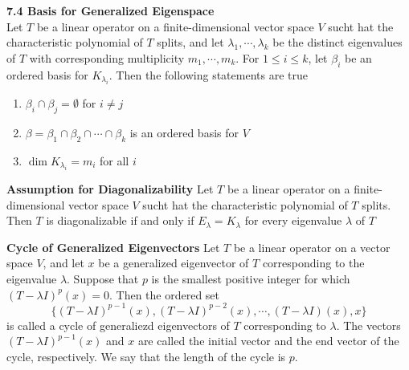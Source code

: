 \documentclass[11pt]{article}
\begin{document}
\begin{theorem*}
    \textbf{7.4 Basis for Generalized Eigenspace} \\
    Let $T$ be a linear operator on a finite-dimensional vector space $V$ sucht hat the characteristic polynomial of $T$ splits, and let $\lambda_1, \cdots, \lambda_k$ be the distinct eigenvalues of $T$ with corresponding multiplicity $m_1,\cdots, m_k$. For $1\leq i \leq k$, let $\beta_i$ be an ordered basis for $K_{\lambda_i}$. Then the following statements are true 
    \begin{enumerate}
        \item $\beta_i \cap \beta_j = \emptyset$ for $i\neq j$ 
        \item $\beta = \beta_1 \cap \beta_2 \cap \cdots \cap \beta_k$ is an ordered basis for $V$
        \item $\dim{K_{\lambda_i}} = m_i$ for all $i$
    \end{enumerate} 
\end{theorem*}

\begin{corollary*}
    \textbf{Assumption for Diagonalizability} Let $T$ be a linear operator on a finite-dimensional vector space $V$ sucht hat the characteristic polynomial of $T$ splits. Then $T$ is diagonalizable if and only if $E_{\lambda} = K_{\lambda}$ for every eigenvalue $\lambda$ of $T$
\end{corollary*}

\begin{defn*}
    \textbf{Cycle of Generalized Eigenvectors} Let $T$ be a linear operator on a vector space $V$, and let $x$ be a generalized eigenvector of $T$ corresponding to the eigenvalue $\lambda$. Suppose that $p$ is the smallest positive integer for which $(T-\lambda I)^p (x) = 0$. Then the ordered set 
    \[
        \{ (T-\lambda I)^{p-1}(x), (T-\lambda I)^{p-2}(x), \cdots, (T-\lambda I)(x), x \}
    \]
    is called a cycle of generaliezd eigenvectors of $T$  corresponding to $\lambda$. The vectors $(T-\lambda I)^{p-1}(x)$ and $x$ are called the initial vector and the end vector of the cycle, respectively. We say that the length of the cycle is $p$.
\end{defn*}
 
\end{document}
